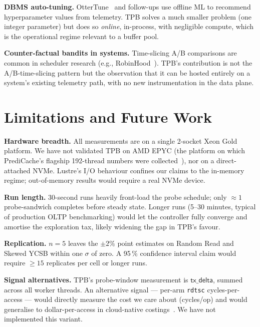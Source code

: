 \documentclass[10pt,twocolumn]{article}
\begin{document}
\textbf{DBMS auto-tuning.}  OtterTune~\cite{ottertune} and follow-ups
use offline ML to recommend hyperparameter values from telemetry.  TPB
solves a much smaller problem (one integer parameter) but does so
\emph{online}, in-process, with negligible compute, which is the
operational regime relevant to a buffer pool.

\textbf{Counter-factual bandits in systems.}  Time-slicing A/B
comparisons are common in scheduler research (e.g.,
RobinHood~\cite{robinhood}).  TPB's contribution is not the
A/B-time-slicing pattern but the observation that it can be hosted
entirely on a system's existing telemetry path, with no new
instrumentation in the data plane.

\section{Limitations and Future Work}

\textbf{Hardware breadth.}  All measurements are on a single
2-socket Xeon Gold platform.  We have not validated TPB on
AMD EPYC (the platform on which PrediCache's flagship 192-thread
numbers were collected~\cite{zinsmeister2026predictive}), nor on a
direct-attached NVMe.  Lustre's I/O behaviour confines our claims to
the in-memory regime; out-of-memory results would require a real NVMe
device.

\textbf{Run length.}  30-second runs heavily front-load the probe
schedule; only $\approx 1$ probe-sandwich completes before steady
state.  Longer runs (5--30 minutes, typical of production OLTP
benchmarking) would let the controller fully converge and amortise
the exploration tax, likely widening the gap in TPB's favour.

\textbf{Replication.}  $n\!=\!5$ leaves the $\pm 2\%$ point estimates
on Random Read and Skewed YCSB within one $\sigma$ of zero.  A 95\,\%
confidence interval claim would require $\geq 15$ replicates per cell
or longer runs.

\textbf{Signal alternatives.}  TPB's probe-window measurement is
$\textsf{tx\_delta}$, summed across all worker threads.  An
alternative signal --- per-arm \texttt{rdtsc} cycles-per-access ---
would directly measure the cost we care about
(\textsf{cycles}/\textsf{op}) and would generalise to dollar-per-access
in cloud-native costings~\cite{cloud_five_minute_rule}.  We have not
implemented this variant.
\end{document}
